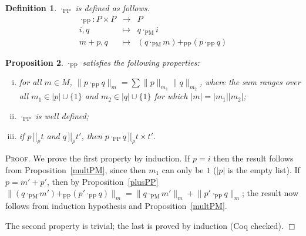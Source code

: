 \documentclass{article}
\newtheorem{definition}{Definition}[section]
\newtheorem{proposition}[definition]{Proposition}
\newenvironment{proof}{\smallskip\textsc{Proof.}}{\hspace*{\fill}$\Box$}
\newcommand{\intII}{\,]\![}
\newcommand{\intrel}{\mathbin{\intII_{\rho}}}
\newcommand{\coeff}[2]{\ensuremath{\|#2\|_{#1}}}
\newcommand{\plusPP}{\ensuremath{+_{\mathrm{PP}}}}
\newcommand{\multPM}{\ensuremath{\cdot_{\mathrm{PM}}}}
\newcommand{\multPP}{\ensuremath{\cdot_{\mathrm{PP}}}}
\begin{document}
\begin{definition}\label{defn:multPP} {\multPP} is defined as follows.
\begin{eqnarray*}
\multPP : P\times P & \to & P \\
 i, q & \mapsto & q\multPM i \\
 m+p, q & \mapsto & (q\multPM m)\plusPP (p\multPP q)
\end{eqnarray*}
\end{definition}

\begin{proposition}\label{multPP}
{\multPP} satisfies the following properties:
\begin{enumerate}[(i)]
\item for all $m\in M$, $\coeff m{p\multPP q}=\sum\coeff{m_1}p\coeff{m_2}q$,
where the sum ranges over all $m_1\in|p|\cup\{1\}$ and
$m_2\in|q|\cup\{1\}$ for which $|m|=|m_1||m_2|$;
\item {\multPP} is well defined;
\item if $p\intrel t$ and $q\intrel t'$, then $p\multPP q\intrel t\times t'$.
\end{enumerate}
\end{proposition}
\begin{proof}
We prove the first property by induction.  If $p=i$ then the result follows
from Proposition~\ref{multPM}, since then $m_1$ can only be $1$ ($|p|$ is the
empty list).
If $p=m'+p'$, then by Proposition~\ref{plusPP}
$\coeff m{(q\multPM m')\plusPP(p'\multPP q)}=%
\coeff m{q\multPM m'}+\coeff m{p'\multPP q}$; the result now follows from
induction hypothesis and Proposition~\ref{multPM}.

The second property is trivial; the last is proved by induction (Coq checked).
\end{proof}
\end{document}
